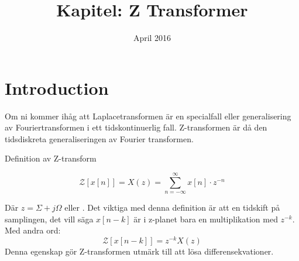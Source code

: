 \documentclass{article}
\title{Kapitel: Z Transformer}
\author{ }
\date{April 2016}
\begin{document}
\maketitle

\section{Introduction}

Om ni kommer ihåg att Laplacetransformen är en specialfall eller generalisering av Fouriertransformen i ett 
tidskontinuerlig fall. Z-transformen är då den tidsdiskreta generaliseringen av Fourier transformen. 

Definition av Z-transform

$$\mathcal{Z}[x[n]] = X(z) = \sum_{n=-\infty}^{\infty} x[n] \cdot z^{-n} $$

Där $z = \Sigma + j\Omega$ eller .
Det viktiga med denna definition är att en tidskift på samplingen, det vill säga $x[n-k]$ är i 
z-planet bara en multiplikation med $z^{-k}$. Med andra ord:
$$\mathcal{Z}[x[n-k]] = z^{-k} X(z) $$ %
Denna egenskap gör Z-transformen utmärk till att lösa differensekvationer. 

\appendix
\end{document}
